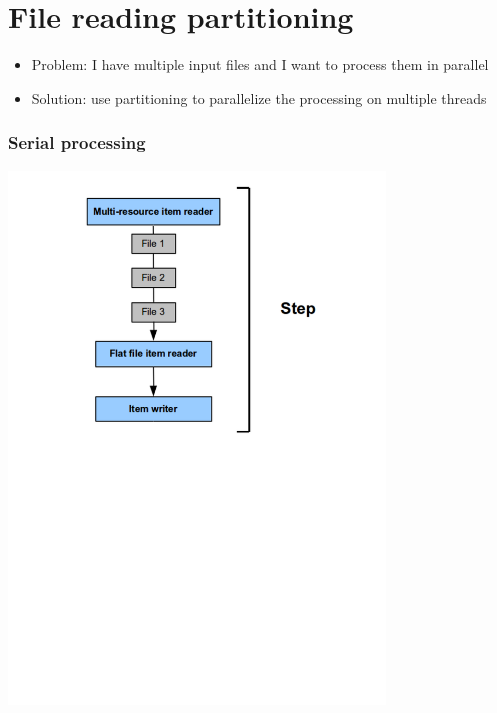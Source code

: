 \section{File reading partitioning}

\begin{frame}
 \begin{itemize}
  \item Problem: I have multiple input files and I want to process them in parallel
  \item Solution: use partitioning to parallelize the processing on multiple threads
 \end{itemize}
\end{frame}

\begin{frame}
 \frametitle{Serial processing}
 \begin{center}
 \includegraphics[width=10cm]{figures/input-files-serial.pdf}
 \end{center}
\end{frame}


